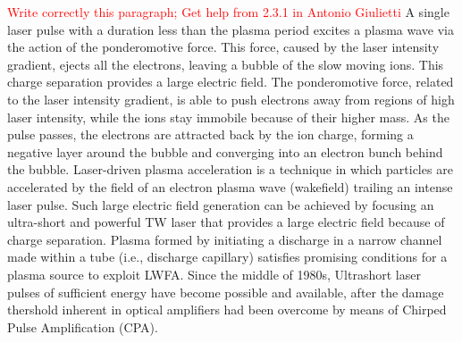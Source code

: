 \documentclass[justified,nofonts,nobib]{tufte-book}
\begin{document}
\textcolor{red}{Write correctly this paragraph; Get help from 2.3.1 in Antonio Giulietti}
A single laser pulse with a duration less than the plasma period excites a plasma wave via the action of the ponderomotive force. This force, caused by the laser intensity gradient, ejects all the electrons, leaving a bubble of the slow moving ions. This charge separation provides a large electric field. The ponderomotive force, related to the laser intensity gradient, is able to push electrons away from regions of high laser intensity, while the ions stay immobile because of their higher mass. As the pulse passes, the electrons are attracted back by the ion charge, forming a negative layer around the bubble and converging into an electron bunch behind the bubble.
Laser-driven plasma acceleration is a technique in which particles are accelerated by the field of an electron plasma wave (wakefield) trailing an intense laser pulse. Such large electric field generation can be achieved by focusing an ultra-short and powerful TW laser that provides a large electric field because of charge separation. Plasma formed by initiating a discharge in a narrow channel made within a tube (i.e., discharge capillary) satisfies promising
conditions for a plasma source to exploit LWFA. Since the middle of 1980s, Ultrashort laser pulses of sufficient energy have become possible and available, after the damage thershold inherent in optical amplifiers had been overcome by means of Chirped Pulse Amplification (CPA)\cite{Strickland1985}.
\end{document}
